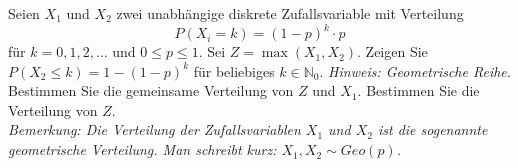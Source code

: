 \begin{Exercise}
	Seien $X_1$ und $X_2$ zwei unabhängige diskrete Zufallsvariable mit Verteilung
	\begin{equation*}
		P(X_i=k)=(1-p)^k\cdot p
	\end{equation*}
	für $k=0,1,2,\dots$ und $0\leq p\leq 1$. Sei $Z=\max(X_1,X_2)$.
	\Question Zeigen Sie $P(X_2\leq k)=1-(1-p)^k$ für beliebiges $k\in\mathbb{N}_0$. \textit{Hinweis: Geometrische Reihe.}
	\Question Bestimmen Sie die gemeinsame Verteilung von $Z$ und $X_1$.
	\Question Bestimmen Sie die Verteilung von $Z$.\\
	\textit{Bemerkung: Die Verteilung der Zufallsvariablen $X_1$ und $X_2$ ist die sogenannte geometrische Verteilung. Man schreibt kurz: $X_1,X_2\sim Geo(p)$.}
\end{Exercise}

